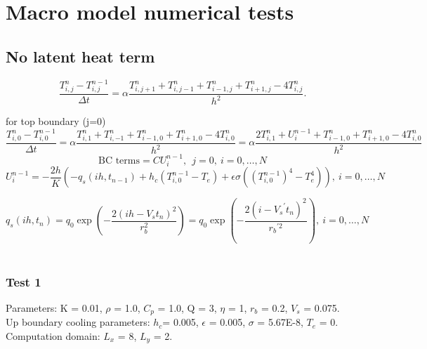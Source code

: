 \documentclass[a4paper,12pt]{article}
\begin{document}
\section{Macro model numerical tests}

\subsection{No latent heat term}

\begin{equation}
\frac{T_{i,j}^n - T_{i,j}^{n-1}}{\Delta t} = \alpha \frac{T_{i,j+1}^n + T_{i,j-1}^n + T_{i-1,j}^n + T_{i+1,j}^n - 4 T_{i,j}^n }{h^2}.
\end{equation}


for top boundary (j=0)
\begin{equation}
\frac{T_{i,0}^n - T_{i,0}^{n-1}}{\Delta t} = \alpha \frac{T_{i,1}^n + T_{i,-1}^n + T_{i-1,0}^n + T_{i+1,0}^n - 4 T_{i,0}^n }{h^2} =\alpha \frac{2T_{i,1}^n + U_i^{n-1}+ T_{i-1,0}^n + T_{i+1,0}^n - 4 T_{i,0}^n }{h^2} 
\end{equation}
\begin{equation}
 \text{BC terms}=CU_i^{n-1},\ \  j=0,  \ i = 0 , \dots , N
\end{equation}
\begin{equation}
U_i^{n-1}=-\frac{2h}{K}\left(-q_s (ih, t_{n-1}) + h_c (T^{n-1}_{i,0} - T_e) + \epsilon \sigma ( (T^{n-1}_{i,0})^4 - T_e^4)\right), \ i = 0 , \dots , N
\end{equation}

\begin{equation}
q_s (ih, t_n) =q_0\exp \left( -\frac{ 2(ih-V_s t_n)^2}{ r_b^2} \right)= q_0\exp \left( -\frac{ 2(i-{V_s}^{'} t_n)^2}{{ r_b}^{'2}} \right) , \ i = 0 , \dots , N
\end{equation}
\\
\subsubsection{Test 1}
Parameters: K = 0.01, $\rho$ = 1.0, $C_p$ = 1.0, Q = 3, $\eta$ = 1, $r_b$ = 0.2, $V_s$ = 0.075. \\
Up boundary cooling parameters: $h_c$= 0.005, $\epsilon$ = 0.005, $\sigma$ = 5.67E-8, $T_e$ = 0.\\
Computation domain: $L_x$ = 8, $L_y$ = 2.
\end{document}
